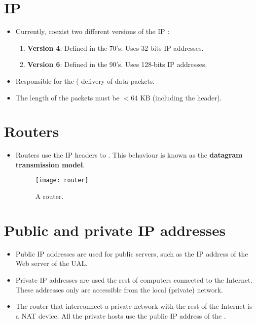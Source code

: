 \section{\gls{IP}}
\begin{itemize}
\item Currently, coexist two different versions of the IP
  \cite{wikipedia_IP}:
  \begin{enumerate}
  \item \textbf{Version 4}: Defined in the 70's. Uses 32-bits IP addresses.
  \item \textbf{Version 6}: Defined in the 90's. Uses 128-bits IP addresses.
  \end{enumerate}
\item Responsible for the ( delivery of data packets.
\item The length of the packets must be $<6$4 KB (including the header).
\end{itemize}

\section{Routers}
\begin{itemize} 
\item Routers use the IP headers to . This behaviour is known as the \textbf{datagram
    transmission model}.
\begin{figure}[H]
  \vspace{1ex}
  \centering
  \texttt{[image: router]}
  \caption{A router.}
  \label{fig:router}
\end{figure}
\end{itemize}

\section{Public and private IP addresses}
\begin{itemize}
\item Public IP addresses are used for public servers, such as the IP
  address of the Web server of the UAL.
\item Private IP addresses are used the rest of computers connected to
  the Internet. These addresses only are accessible from the local
  (private) network.
\item The router that interconnect a private network with the rest of
  the Internet is a \gls{NAT} device. All the private hosts use the
  public IP address of the .
\end{itemize}

